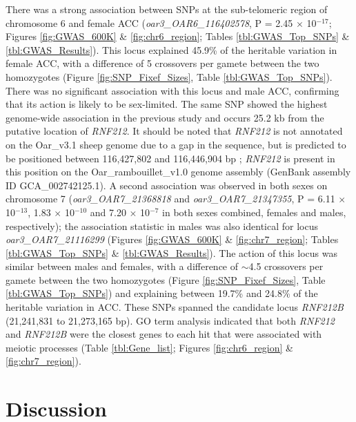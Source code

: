 \documentclass[a4paper,11pt]{article}
\begin{document}
There was a strong association between SNPs at the sub-telomeric region of chromosome 6 and female ACC (\textit{oar3\_OAR6\_116402578}, P = 2.45 $\times$ 10$^{-17}$; Figures \ref{fig:GWAS_600K} \& \ref{fig:chr6_region}; Tables \ref{tbl:GWAS_Top_SNPs} \& \ref{tbl:GWAS_Results}). This locus explained 45.9\% of the heritable variation in female ACC, with a difference of 5 crossovers per gamete between the two homozygotes (Figure \ref{fig:SNP_Fixef_Sizes}, Table \ref{tbl:GWAS_Top_SNPs}). There was no significant association with this locus and male ACC, confirming that its action is likely to be sex-limited. The same SNP showed the highest genome-wide association in the previous study \citep{Johnston2016} and occurs 25.2 kb from the putative location of \textit{RNF212}. It should be noted that \textit{RNF212} is not annotated on the Oar\_v3.1 sheep genome due to a gap in the sequence, but is predicted to be positioned between 116,427,802 and 116,446,904 bp \citep{Johnston2016}; \textit{RNF212} is present in this position on the Oar\_rambouillet\_v1.0 genome assembly (GenBank assembly ID GCA\_002742125.1). A second association was observed in both sexes on chromosome 7 (\textit{oar3\_OAR7\_21368818} and \textit{oar3\_OAR7\_21347355}, P = 6.11 $\times$ 10$^{-13}$, 1.83 $\times$ 10$^{-10}$ and 7.20 $\times$ 10$^{-7}$ in both sexes combined, females and males, respectively); the association statistic in males was also identical for locus \textit{oar3\_OAR7\_21116299} (Figures \ref{fig:GWAS_600K} \& \ref{fig:chr7_region}; Tables \ref{tbl:GWAS_Top_SNPs} \& \ref{tbl:GWAS_Results}). The action of this locus was similar between males and females, with a difference of $\sim$4.5 crossovers per gamete between the two homozygotes (Figure \ref{fig:SNP_Fixef_Sizes}, Table \ref{tbl:GWAS_Top_SNPs}) and explaining between 19.7\% and 24.8\% of the heritable variation in ACC. These SNPs spanned the candidate locus \textit{RNF212B} (21,241,831 to 21,273,165 bp). GO term analysis indicated that both \textit{RNF212} and \textit{RNF212B} were the closest genes to each hit that were associated with meiotic processes (Table \ref{tbl:Gene_list}; Figures \ref{fig:chr6_region} \& \ref{fig:chr7_region}).

\pagebreak

\section*{Discussion}
\end{document}
